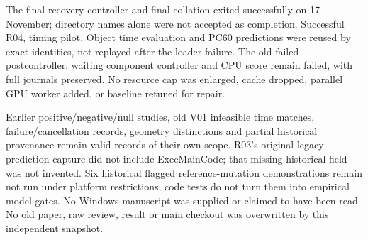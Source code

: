 \documentclass[10pt,twocolumn]{article}
\begin{document}
The final recovery controller and final collation exited successfully on
17 November; directory names alone were not accepted as completion.
Successful R04, timing pilot, Object time evaluation and PC60 predictions
were reused by exact identities, not replayed after the loader failure.
The old failed postcontroller, waiting component controller and CPU score
remain failed, with full journals preserved. No resource cap was enlarged,
cache dropped, parallel GPU worker added, or baseline retuned for repair.

Earlier positive/negative/null studies, old V01 infeasible time matches,
failure/cancellation records, geometry distinctions and partial historical
provenance remain valid records of their own scope. R03's original legacy
prediction capture did not include ExecMainCode; that missing historical
field was not invented. Six historical flagged reference-mutation
demonstrations remain not run under platform restrictions; code tests do not
turn them into empirical model gates. No Windows manuscript was supplied or
claimed to have been read. No old paper, raw review, result or main checkout
was overwritten by this independent snapshot.
\end{document}
